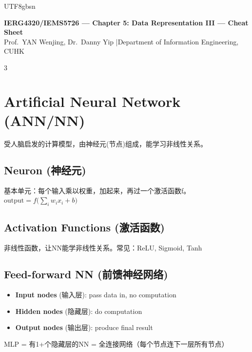 \documentclass[9pt,landscape,a4paper]{article}
\newcommand{\zhint}[1]{{\scriptsize\color{gray!70!black}#1}}
\begin{document}
\begin{CJK}{UTF8}{gbsn}

\begin{center}
    {\large\bfseries IERG4320/IEMS5726 --- Chapter 5: Data Representation III --- Cheat Sheet}\\[2pt]
    {\small Prof.\ YAN Wenjing, Dr.\ Danny Yip \quad|\quad Department of Information Engineering, CUHK}
\end{center}

\vspace{2pt}
\begin{multicols}{3}

\section{Artificial Neural Network \zhint{(ANN/NN)}}

\zhint{受人脑启发的计算模型，由神经元(节点)组成，能学习非线性关系。}

\subsection{Neuron \zhint{(神经元)}}
\zhint{基本单元：每个输入乘以权重，加起来，再过一个激活函数f。}\\
$\text{output} = f\!\Big(\sum_i w_i x_i + b\Big)$

\subsection{Activation Functions \zhint{(激活函数)}}
\zhint{非线性函数，让NN能学非线性关系。常见：ReLU, Sigmoid, Tanh}

\subsection{Feed-forward NN \zhint{(前馈神经网络)}}
\begin{itemize}[leftmargin=*, nosep, itemsep=0pt]
    \item \textbf{Input nodes} \zhint{(输入层)}: pass data in, no computation
    \item \textbf{Hidden nodes} \zhint{(隐藏层)}: do computation
    \item \textbf{Output nodes} \zhint{(输出层)}: produce final result
\end{itemize}
\zhint{MLP = 有1+个隐藏层的NN = 全连接网络（每个节点连下一层所有节点）}


\end{multicols}
\end{CJK}
\end{document}
